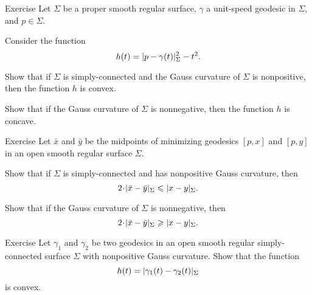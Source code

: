 \begin{thm}{Exercise}\label{ex:geod-convexity}
Let $\Sigma$ be a proper smooth regular surface, 
 $\gamma$ a unit-speed geodesic in $\Sigma$, and $p\in\Sigma$.

Consider the function
\[h(t)=\dist{p}{\gamma(t)}\Sigma^2-t^2.\]

\begin{subthm}{}
Show that if $\Sigma$ is simply-connected and the Gauss curvature of $\Sigma$ is nonpositive, then the function $h$ is convex.
\end{subthm}

\begin{subthm}{} Show that if the Gauss curvature of $\Sigma$ is nonnegative, then the function $h$ is concave.
\end{subthm}

\end{thm}

\begin{thm}{Exercise}\label{ex:midpoints}
Let $\bar x$ and $\bar y$ be the midpoints of minimizing geodesics $[p,x]$ and $[p,y]$ in an open smooth regular surface $\Sigma$.

\begin{subthm}{}
Show that if $\Sigma$ is simply-connected and has nonpositive Gauss curvature, then 
\[2\cdot \dist{\bar x}{\bar y}\Sigma\le \dist{x}{y}\Sigma.\]
\end{subthm}
 
\begin{subthm}{} Show that if the Gauss curvature of $\Sigma$ is nonnegative, then 
 \[2\cdot \dist{\bar x}{\bar y}\Sigma\ge \dist{x}{y}\Sigma.\]
\end{subthm}

\end{thm}

\begin{thm}{Exercise}\label{ex:convex-dist}
Let $\gamma_1$ and $\gamma_2$ be two geodesics in an open smooth regular simply-connected surface $\Sigma$ with nonpositive Gauss curvature.
Show that the function
\[h(t)=\dist{\gamma_1(t)}{\gamma_2(t)}\Sigma\]
is convex.
\end{thm}

